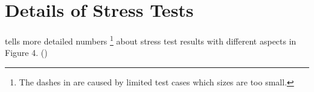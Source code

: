 %
\section{Details of Stress Tests}
 tells more detailed numbers
\footnote{The dashes in  are caused by limited test cases 
which sizes are too small.} 
about 
stress test results with different aspects in Figure 4. ()

